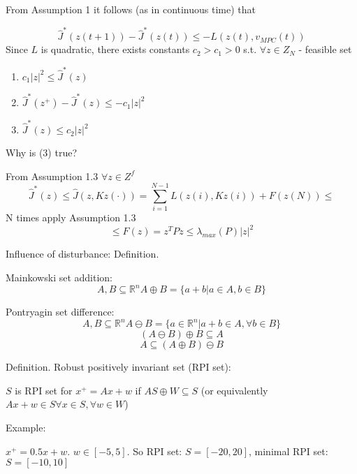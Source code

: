 From Assumption 1 it follows (as in continuous time) that 

\begin{equation*}
\hat J^*(z(t+1)) - \hat J^*(z(t)) \leq - L(z(t), v_{MPC}(t))
\end{equation*}
Since $L$ is quadratic, there exists constants $c_2 > c_1 > 0$ s.t. $\forall z \in Z_N $ - feasible set
\begin{enumerate}
\item $c_1|z|^2 \leq \hat J^*(z)$
\item $\hat J^*(z^+) - \hat J^*(z) \leq - c_1 |z|^2$
\item $\hat J^*(z) \leq c_2|z|^2$
\end{enumerate}

Why is (3) true?

From Assumption 1.3 $\forall z \in Z^f$
\begin{equation*}
\hat J^*(z) \leq \hat J(z,Kz(\cdot)) = \sum_{i=1}^{N-1}L(z(i),Kz(i)) + F(z(N)) \leq 
\end{equation*}
N times apply Assumption 1.3
\begin{equation*}
\leq F(z) = z^TPz \leq \lambda_{max}(P)|z|^2
\end{equation*}

Influence of disturbance:
Definition.

Mainkowski set addition: 
\begin{equation*}
A,B \subseteq \mathbb{R}^n A \oplus B = \{ a+b | a \in A, b\in B\}
\end{equation*}

Pontryagin set difference:
\begin{equation*}
A, B \subseteq \mathbb{R}^n A \ominus B = \{ a \in \mathbb{R}^n| a+b \in A, \forall b \in B\}
\end{equation*}
\begin{equation*}
(A \ominus B) \oplus B \subseteq A
\end{equation*}
\begin{equation*}
A \subseteq (A \oplus B) \ominus B
\end{equation*}

Definition.
Robust positively invariant set (RPI set):

$S$ is RPI set for $x^+=Ax+w$ if $AS \oplus W \subseteq S$ (or equivalently $Ax+w \in S \forall x \in S, \forall w \in W$)

Example:

$x^+ = 0.5x + w$. $w \in [-5,5]$. So RPI set: $S = [-20, 20]$, minimal RPI set: $S = [-10,10]$

